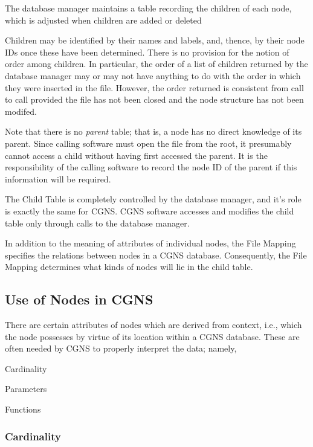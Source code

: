 The database manager maintains a table recording the
children of each node, which is adjusted when children are added or
deleted

Children may be identified by their names and labels, and, thence,
by their node IDs once these have been determined. There is no provision
for the notion of order among children. In particular, the order of a
list of children returned by the database manager may or may not have
anything to do with the order in which they
were inserted in the file. However, the order returned is consistent
from call to call provided the file has not been closed and the node
structure has not been modifed.

Note that there is no \emph{parent} table; that is, a node has no direct
knowledge of its parent. Since calling software must open the file
from the root, it presumably cannot access a child without having
first accessed the parent.  It is the responsibility of the calling
software to record the node ID of the parent if this information will be
required.

The Child Table is completely controlled by the database manager,
and it's role is exactly the same for CGNS. CGNS software accesses and
modifies the child table only through calls to the database manager.

In addition to the meaning of attributes of individual nodes,
the File Mapping specifies the relations between nodes in a CGNS
database. Consequently, the File Mapping determines what kinds of nodes
will lie in the child table.

\subsection{Use of Nodes in CGNS}
\label{s:nodeuse}

There are certain attributes of nodes which are
derived from context, i.e., which the node possesses by virtue of its
location within a CGNS database. These are often needed by CGNS to
properly interpret the data; namely,

\begin{itemize*}
\item Cardinality
\item Parameters
\item Functions
\end{itemize*}

\subsubsection{Cardinality}
\label{s:cardinality}

